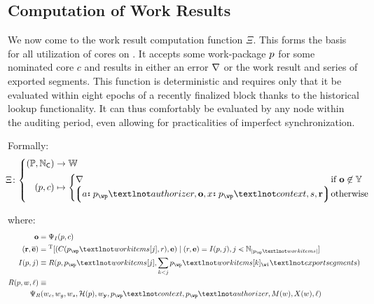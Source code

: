 \subsection{Computation of Work Results}\label{sec:computeworkresult}

We now come to the work result computation function $\Xi$. This forms the basis for all utilization of cores on \Jam. It accepts some work-package $p$ for some nominated core $c$ and results in either an error $\nabla$ or the work result and series of exported segments. This function is deterministic and requires only that it be evaluated within eight epochs of a recently finalized block thanks to the historical lookup functionality. It can thus comfortably be evaluated by any node within the auditing period, even allowing for practicalities of imperfect synchronization.

Formally:
\begin{equation}\label{eq:workresultfunction}
  \!\!\Xi \colon \left\{\begin{aligned}
    (\mathbb{P}, \N_\mathsf{C}) &\to \mathbb{W} \\
    (\wpX, c) &\mapsto \begin{cases}
        \error &\when \mathbf{o} \not\in \Y \\
        \tup{\is{a}{\wpX_\wp¬authorizer}, \mathbf{o}, \is{x}{\wpX_\wp¬context}, s, \mathbf{r}} \!\!\!\!\!&\otherwise
    \end{cases}
  \end{aligned}\right.\!\!\!\!\!\!\!
\end{equation}

where:
\begin{align*}
  \mathbf{o} &= \Psi_I(\wpX, c) \\
  (\mathbf{r}, \overline{\mathbf{e}}) &= \transpose[
    (\itemtoresult(\wpX_\wp¬workitems[j], r), \mathbf{e})
    \mid
    (r, \mathbf{e}) = \countupexports(\wpX, j),
    j \orderedin \N_{|\wpX_\wp¬workitems|}
  ] \\
  \countupexports(\wpX, j) &\equiv \marshallrefine(
    \wpX,
    \wpX_\wp¬workitems[j],
    \sum_{k < j}\wpX_\wp¬workitems[k]_\wi¬exportsegments
  )\\
  \marshallrefine(\wpX, w, \ell) &\equiv \\
  &\!\!\!\!\!\!\!\Psi_R(
    \wiX_c,
    \wiX_g,
    \wiX_s,
    \mathcal{H}(\wpX),
    \wiX_\mathbf{y},
    \wpX_\wp¬context,
    \wpX_\wp¬authorizer,
    \importsegmentdata(w),
    \extrinsicdata(w),
    \ell
  )
\end{align*}

